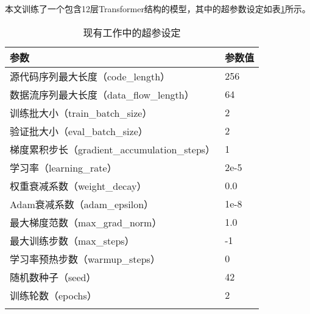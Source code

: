 本文训练了一个包含12层Transformer结构的模型，其中的超参数设定如表\ref{tab:super_parameters}所示。
\begin{table}[htbp]
    \caption{\label{tab:super_parameters}现有工作中的超参设定}
    \small
    \renewcommand{\arraystretch}{1.5}
    \begin{tabularx}{\linewidth}{lX<{\centering}}
        \Xhline{2\arrayrulewidth}
        参数                            & 参数值  \\ \hline
        源代码序列最大长度（code\_length）                  & 256  \\
        数据流序列最大长度（data\_flow\_length）            & 64   \\
        训练批大小（train\_batch\_size）            & 2    \\
        验证批大小（eval\_batch\_size）             & 2    \\
        梯度累积步长（gradient\_accumulation\_steps） & 1    \\
        学习率（learning\_rate）                & 2e-5 \\
        权重衰减系数（weight\_decay）                 & 0.0  \\
        Adam衰减系数（adam\_epsilon）                 & 1e-8 \\
        最大梯度范数（max\_grad\_norm）               & 1.0  \\
        最大训练步数（max\_steps）                    & -1   \\
        学习率预热步数（warmup\_steps）                 & 0    \\
        随机数种子（seed）                          & 42   \\
        训练轮数（epochs）                        & 2    \\ \Xhline{2\arrayrulewidth}
        \end{tabularx}
\end{table}




